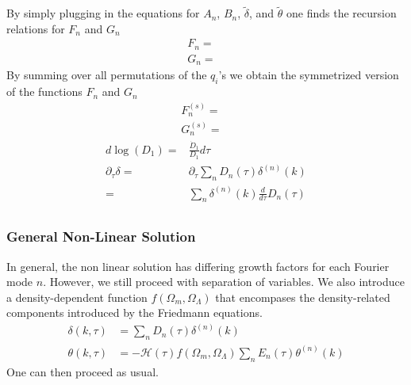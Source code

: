 By simply plugging in the equations for $A_n$, $B_n$, $\tilde{\delta}$, and $\tilde{\theta}$ one finds the recursion relations for $F_n$ and $G_n$
\begin{equation}
	\begin{split}
		F_n =& \\
		G_n =&
	\end{split}
\end{equation}
By summing over all permutations of the $q_i$'s we obtain the symmetrized version of the functions $F_n$ and $G_n$ 
\begin{equation}
	\begin{split}
		F^{(s)}_n =& \\
		G_n^{(s)} =&
	\end{split}
\end{equation}
\begin{equation}
	\begin{split}
		d \log (D_1) =& \frac{\dot D_1}{D_1}d\tau \\
		\partial_\tau\delta =& \partial_\tau \sum_n D_n(\tau)\delta^{(n)}(k) \\
		=& \sum_n \delta^{(n)}(k) \frac{d}{d\tau} D_n(\tau) \\
	\end{split}
\end{equation}

\subsubsection{General Non-Linear Solution}
In general, the non linear solution has differing growth factors for each Fourier mode $n$. However, we still proceed with separation of variables. We also introduce a density-dependent function $f(\Omega_m,\Omega_\Lambda)$ that encompases the density-related components introduced by the Friedmann equations.
\begin{equation}
	\begin{split}
		\delta(k,\tau) &= \sum_n D_n(\tau)\delta^{(n)}(k) \\
		\theta(k,\tau) &= - \mathcal{H}(\tau) f(\Omega_m,\Omega_\Lambda) \sum_n E_n(\tau) \theta^{(n)}(k)
	\end{split}
\end{equation}
One can then proceed as usual.

